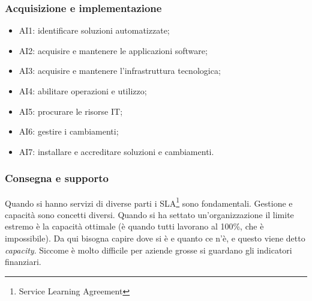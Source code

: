 \subsubsection{Acquisizione e implementazione}

\begin{itemize}
\item AI1: identificare soluzioni automatizzate;
\item AI2: acquisire e mantenere le applicazioni software;
\item AI3: acquisire e mantenere l'infrastruttura tecnologica;
\item AI4: abilitare operazioni e utilizzo;
\item AI5: procurare le risorse IT;
\item AI6: gestire i cambiamenti;
\item AI7: installare e accreditare soluzioni e cambiamenti.
\end{itemize}

\subsubsection{Consegna e supporto}

Quando si hanno servizi di diverse parti i SLA\footnote{Service Learning 
Agreement} sono fondamentali. Gestione e capacità sono concetti diversi. Quando 
si ha settato un'organizzazione il limite estremo è la capacità ottimale (è quando 
tutti lavorano al 100\%, che è impossibile). Da qui bisogna capire dove si è e quanto 
ce n'è, e questo viene detto \textit{capacity}. Siccome è molto difficile per 
aziende grosse si guardano gli indicatori finanziari.
